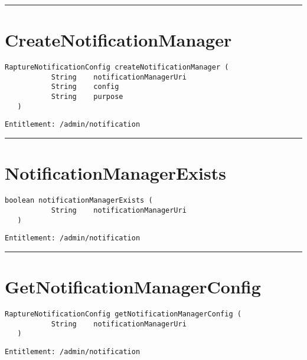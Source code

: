 \rule{12cm}{2pt}
\section{CreateNotificationManager}
\label{Api:CreateNotificationManager}
\begin{lstlisting}[style=nonumbers]
   RaptureNotificationConfig createNotificationManager (
           String    notificationManagerUri
           String    config
           String    purpose
   )
\end{lstlisting}
\begin{Verbatim}[formatcom=\color{Maroon}]
  Entitlement: /admin/notification
\end{Verbatim}



\rule{12cm}{2pt}
\section{NotificationManagerExists}
\label{Api:NotificationManagerExists}
\begin{lstlisting}[style=nonumbers]
   boolean notificationManagerExists (
           String    notificationManagerUri
   )
\end{lstlisting}
\begin{Verbatim}[formatcom=\color{Maroon}]
  Entitlement: /admin/notification
\end{Verbatim}



\rule{12cm}{2pt}
\section{GetNotificationManagerConfig}
\label{Api:GetNotificationManagerConfig}
\begin{lstlisting}[style=nonumbers]
   RaptureNotificationConfig getNotificationManagerConfig (
           String    notificationManagerUri
   )
\end{lstlisting}
\begin{Verbatim}[formatcom=\color{Maroon}]
  Entitlement: /admin/notification
\end{Verbatim}



